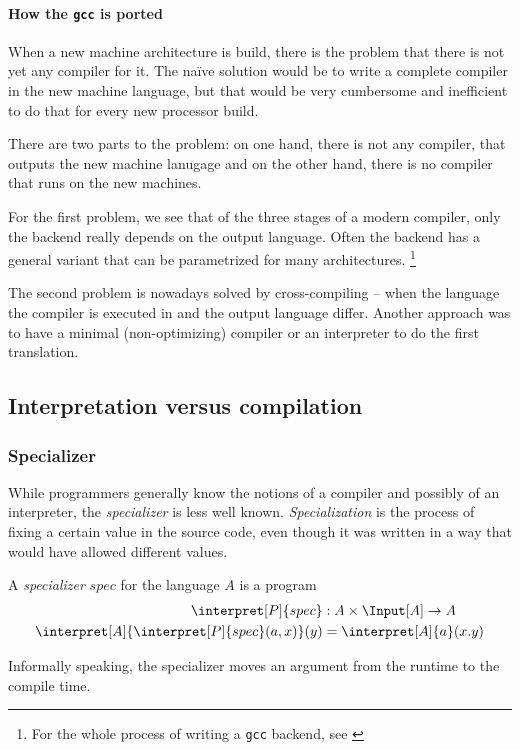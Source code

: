 \paragraph{How the {\tt gcc} is ported} %
\label{par:gcc}
When a new machine architecture is build, there is the problem that there is 
not yet any compiler for it. The naïve solution would be to write a complete 
compiler in the new machine language, but that would be very cumbersome and 
inefficient to do that for every new processor build.

There are two parts to the problem: on one hand, there is not any compiler, 
that outputs the new machine lanugage and on the other hand, there is no 
compiler that runs on the new machines.

For the first problem, we see that of the three stages of a modern compiler,
only the backend really depends on the output language. Often the backend has 
a general variant that can be parametrized for many architectures.
\footnote{For the whole process of writing a {\tt gcc} backend, see \cite{nilsson2000porting}}

The second problem is nowadays solved by cross-compiling -- when the language 
the compiler is executed in and the output language differ. Another approach 
was to have a minimal (non-optimizing) compiler or an interpreter to do the 
first translation.

\subsection{Interpretation versus compilation}

\subsubsection{Specializer} %
\label{sub:Specializer}
While programmers generally know the notions of a compiler and possibly of an 
interpreter, the {\em specializer} is less well known. {\em Specialization} 
is the process of fixing a certain value in the source code, even though it 
was written in a way that would have allowed different values. 

\begin{defn}
	A {\em specializer} $spec$ for the language $A$ is a program 
	\begin{align*}
		\interpret[P]{spec}&:A\times \Input[A]\rightarrow A \\
		\interpret[A]{\interpret[P]{spec}(a, x)}(y) &= \interpret[A]{a}(x.y)
	\end{align*}

	Informally speaking, the specializer moves an argument from the runtime to 
	the compile time.
\end{defn}

